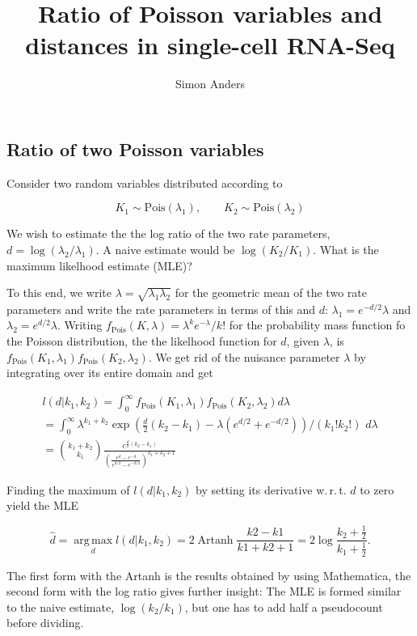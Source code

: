 \documentclass{article}
\title{Ratio of Poisson variables and\\ distances in single-cell RNA-Seq}
\author{Simon Anders}
\begin{document}
\maketitle

\subsection*{Ratio of two Poisson variables}

Consider two random variables distributed according to

\[ K_1 \sim \text{Pois}(\lambda_1), \qquad K_2 \sim \text{Pois}(\lambda_2) \]

We wish to estimate the the log ratio of the two rate parameters, $d = \log(\lambda_2/\lambda_1)$.
A naive estimate would be $\log (K_2/K_1)$. What is the maximum likelhood estimate (MLE)?

To this end, we write $\lambda=\sqrt{\lambda_1 \lambda_2}$ for the geometric mean of the two rate parameters and
write the rate parameters in terms of this and $d$: $\lambda_1=e^{-d/2}\lambda$ and $\lambda_2=e^{d/2}\lambda$.
Writing $f_\text{Pois}(K,\lambda) = \lambda^k e^{-\lambda} / k!$ for the probability mass function fo the Poisson distribution, the
the likelhood function for $d$, given $\lambda$, is $f_\text{Pois}(K_1,\lambda_1) f_\text{Pois}(K_2,\lambda_2)$. 
We get rid of the nuisance parameter $\lambda$ by integrating over its entire domain and get

\begin{multline} l(d|k_1,k_2) = \int_0^\infty f_\text{Pois}(K_1,\lambda_1) f_\text{Pois}(K_2,\lambda_2) d\lambda \\
= \int_0^\infty \lambda^{k_1+k_2} \exp\left( \frac{d}{2}(k_2-k_1) - \lambda (e^{d/2}+e^{-d/2}) \right)  / (k_1! k_2!)\,\, d\lambda \\
= \binom{k_1+k_2}{k_1} \frac{ e^{\frac{d}{2}(k_2-k_1)} }{  \left( \frac{e^d - e^{-d}}{e^{d/2}-e^{-d/2}} \right)^{k_1+k_2+1} }
\end{multline}

Finding the maximum of $l(d|k_1,k_2)$ by setting its derivative w.\,r.\,t. $d$ to zero yield the MLE

\[ \hat d = \operatorname*{arg\,max}_d  l(d|k_1,k_2) = 2 \operatorname{Artanh} \frac{ k2 - k1 } {  k1 + k2 + 1 }  = 2 \log\frac{k_2+\frac{1}{2} }{ k_1+\frac{1}{2}  }. \]

The first form with the Artanh is the results obtained by using Mathematica, the second form with the log ratio gives further insight: The MLE is formed similar to the naive estimate, $\log(k_2/k_1)$, but one has to add half a pseudocount before dividing.
\end{document}

